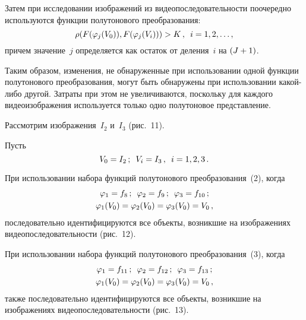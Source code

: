 \begin{multicols}{2}
  Затем при исследовании изображений из видеопоследовательности
поочередно используются функции полутонового преобразования:
  \begin{equation}
  \rho ( F( \varphi_j(V_0)), F(\varphi_j(V_i)))> K\,,\enskip i=1,2,\ldots ,
  \label{e4-zyk}
  \end{equation}
причем значение~$j$ определяется как остаток от деления~$i$ на $(J\hm+1)$.

\columnbreak

  Таким образом, изменения, не обнаруженные при использовании одной
функции полутонового преобразования, могут быть обнаружены при
использовании ка\-кой-ли\-бо другой. Затраты при этом не увеличиваются,
поскольку для каждого видеоизображения используется только одно
полутоновое представление.

  Рассмотрим изображения~$I_2$ и~$I_3$ (рис.~11).

  Пусть
  $$
V_0 = I_2\,;\enskip  V_i = I_3\,,\enskip  i = 1, 2, 3\,.
$$



  При использовании набора функций полутонового преобразования~(2),
когда
  \begin{gather*}
\varphi_1 = f_8\,;\enskip \varphi_2 = f_9\,;\enskip \varphi_3 = f_{10}\,;\\
\varphi_1(V_0) = \varphi_2(V_0) = \varphi_3(V_0) = V_0\,,
\end{gather*}
последовательно идентифицируются все объекты, возникшие на изображениях
видеопоследовательности (рис.~12).



  При использовании набора функций полутонового преобразования~(3),
когда
  \begin{gather*}
\varphi_1 = f_{11}\,;\enskip  \varphi_2 = f_{12}\,;\enskip  \varphi_3 = f_{13}\,;\\
\varphi_1(V_0) = \varphi_2(V_0) = \varphi_3(V_0) = V_0\,,
\end{gather*}
также последовательно идентифицируются все объекты, возникшие на
изображениях видеопоследовательности (рис.~13).

\begin{figure*} %
\vspace*{1pt}
\begin{center}
\mbox{%
\epsfxsize=164mm
}
\end{center}
\vspace*{-9pt}
\vspace*{-6pt}
\end{figure*}


\end{multicols}
